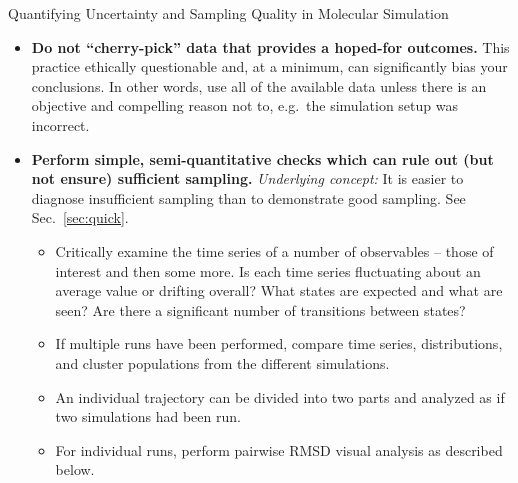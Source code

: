 \begin{Checklists*}[p!]
\begin{checklist}{Quantifying Uncertainty and Sampling Quality in Molecular Simulation}
\begin{itemize}
\item
{\color{red}
\textbf{Do not ``cherry-pick'' data that provides a hoped-for outcomes.}  This practice ethically questionable and, at a minimum, can significantly bias your conclusions.  In other words, use all of the available data unless there is an objective and compelling reason not to, e.g.\ the simulation setup was incorrect.
}
    
\item
\textbf{Perform simple, semi-quantitative checks which can rule out (but not ensure) sufficient sampling.} \emph{Underlying concept:} It is easier to diagnose insufficient sampling than to demonstrate good sampling.  See Sec.\ \ref{sec:quick}.
    \begin{itemize}
    \item Critically examine the time series of a number of observables -- those of interest and then some more.  Is each time series fluctuating about an average value or drifting overall?  What states are expected and what are seen?  Are there a significant number of transitions between states?
    \item If multiple runs have been performed, compare time series, distributions, and cluster populations from the different simulations.
    \item An individual trajectory can be divided into two parts and analyzed as if two simulations had been run.
    \item For individual runs, perform pairwise RMSD visual analysis as described below.
    \end{itemize}
    

\end{itemize}
\end{checklist}
\end{Checklists*}
